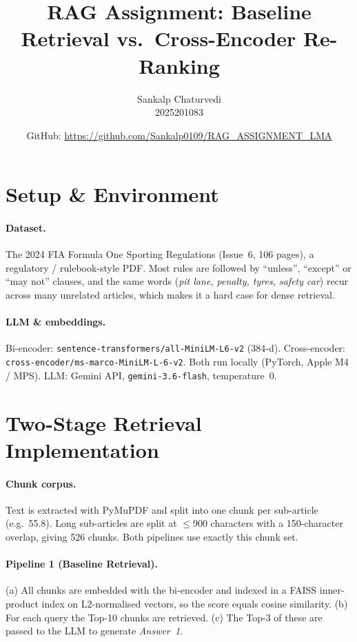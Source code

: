 \documentclass[11pt,a4paper]{article}
\title{RAG Assignment: Baseline Retrieval vs.\ Cross-Encoder Re-Ranking}
\author{Sankalp Chaturvedi \\
  2025201083}
\date{GitHub: \url{https://github.com/Sankalp0109/RAG_ASSIGNMENT_LMA}}
\begin{document}
\maketitle

\section{Setup \& Environment}

\paragraph{Dataset.} The 2024 FIA Formula One Sporting Regulations (Issue~6, 106 pages), a regulatory / rulebook-style
PDF. Most rules are followed by ``unless'', ``except'' or ``may not'' clauses, and the same words (\emph{pit lane,
penalty, tyres, safety car}) recur across many unrelated articles, which makes it a hard case for dense retrieval.

\paragraph{LLM \& embeddings.} Bi-encoder: \texttt{sentence-transformers/all-MiniLM-L6-v2} (384-d). Cross-encoder:
\texttt{cross-encoder/}\allowbreak\texttt{ms-marco-MiniLM-L-6-v2}. Both run locally (PyTorch, Apple M4 / MPS). LLM:
Gemini API, \texttt{gemini-3.6-flash}, temperature~0.

\section{Two-Stage Retrieval Implementation}

\paragraph{Chunk corpus.} Text is extracted with PyMuPDF and split into one chunk per sub-article (e.g.\ 55.8). Long
sub-articles are split at $\le$900 characters with a 150-character overlap, giving 526 chunks. Both pipelines use
exactly this chunk set.

\paragraph{Pipeline 1 (Baseline Retrieval).} (a) All chunks are embedded with the bi-encoder and indexed in a FAISS
inner-product index on L2-normalised vectors, so the score equals cosine similarity. (b) For each query the Top-10
chunks are retrieved. (c) The Top-3 of these are passed to the LLM to generate \emph{Answer~1}.
\end{document}
